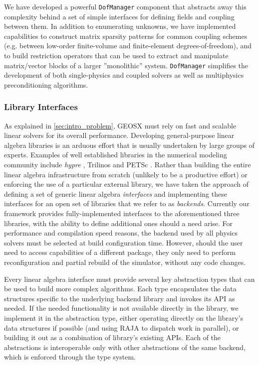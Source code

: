 We have developed a powerful \texttt{DofManager} component that abstracts away this complexity behind a set of simple interfaces for defining fields and coupling between them.   In addition to enumerating unknowns, we have implemented capabilities to construct matrix sparsity patterns for common coupling schemes (e.g. between low-order finite-volume and finite-element degrees-of-freedom), and to build restriction operators that can be used to extract and manipulate matrix/vector blocks of a larger ''monolithic'' system.   \texttt{DofManager} simplifies the development of both single-physics and coupled solvers as well as multiphysics preconditioning algorithms.

\subsubsection{Library Interfaces}

As explained in \cref{sec:intro_problem}, GEOSX must rely on fast and scalable linear solvers for its overall performance.   Developing general-purpose linear algebra libraries is an arduous effort that is usually undertaken by large groups of experts.   Examples of well established libraries in the numerical modeling community include \textit{hypre} \cite{hypre}, Trilinos \cite{trilinos-website} and PETSc \cite{petsc-user-ref}.   Rather than building the entire linear algebra infrastructure from scratch (unlikely to be a productive effort) or enforcing the use of a particular external library, we have taken the approach of defining a set of generic linear algebra \textit{interfaces} and implementing these interfaces for an open set of libraries that we refer to as \textit{backends}.   Currently our framework provides fully-implemented interfaces to the aforementioned three libraries, with the ability to define additional ones should a need arise.   For performance and compilation speed reasons, the backend used by all physics solvers must be selected at build configuration time.   However, should the user need to access capabilities of a different package, they only need to perform reconfiguration and partial rebuild of the simulator, without any code changes.

Every linear algebra interface must provide several key abstraction types that can be used to build more complex algorithms.   Each type encapsulates the data structures specific to the underlying backend library and invokes its API as needed.   If the needed functionality is not available directly in the library, we implement it in the abstraction type, either operating directly on the library's data structures if possible (and using RAJA to dispatch work in parallel), or building it out as a combination of library's existing APIs.   Each of the abstractions is interoperable only with other abstractions of the same backend, which is enforced through the type system.

